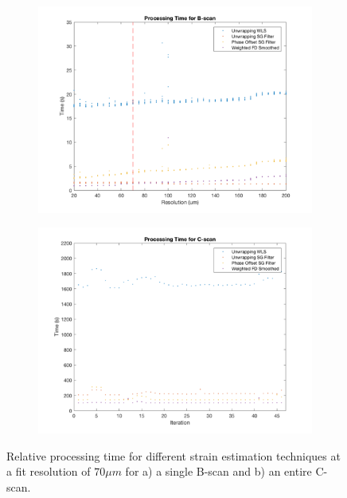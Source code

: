 \begin{figure}
	\centering
    \begin{subfigure}{0.49\textwidth}
    	\centering
        \includegraphics[width=\textwidth]{figures/2d_time_a.png}
    \end{subfigure}
    \begin{subfigure}{0.49\textwidth}
    	\centering
        \includegraphics[width=\textwidth]{figures/3d_time_a.png}
    \end{subfigure}
    \caption{Relative processing time for different strain estimation techniques at a fit resolution of $70\mu m$ for a) a single B-scan and b) an entire C-scan.}
    \label{process_time_1}
\end{figure}

